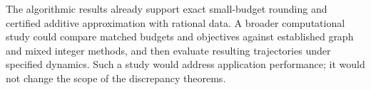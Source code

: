 The algorithmic results already support exact small-budget rounding and
certified additive approximation with rational data. A broader computational
study could compare matched budgets and objectives against established graph
and mixed integer methods, and then evaluate resulting trajectories under
specified dynamics. Such a study would address application performance;
it would not change the scope of the discrepancy theorems.
